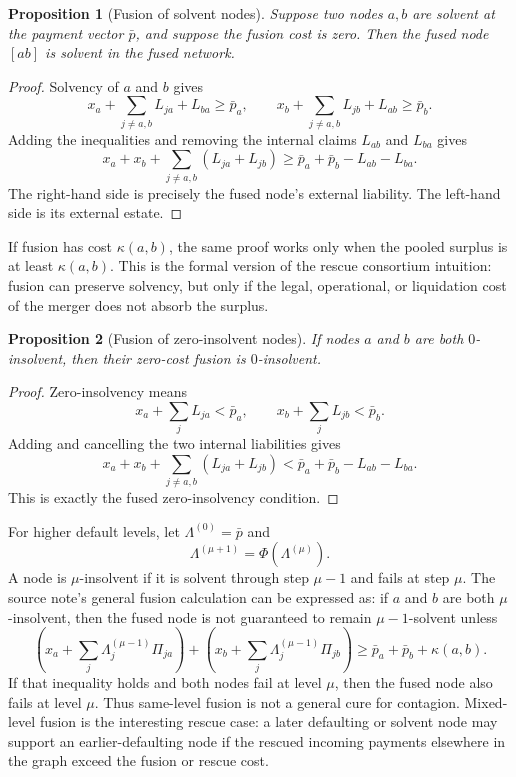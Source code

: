 \documentclass[11pt,oneside]{article}
\newtheorem{proposition}{Proposition}
\newcommand{\barp}{\bar p}
\begin{document}
\begin{proposition}[Fusion of solvent nodes]
Suppose two nodes $a,b$ are solvent at the payment vector $\barp$, and suppose
the fusion cost is zero. Then the fused node $[ab]$ is solvent in the fused
network.
\end{proposition}

\begin{proof}
Solvency of $a$ and $b$ gives
\[
  x_a+\sum_{j\neq a,b}L_{ja}+L_{ba}\geq \barp_a,
  \qquad
  x_b+\sum_{j\neq a,b}L_{jb}+L_{ab}\geq \barp_b.
\]
Adding the inequalities and removing the internal claims $L_{ab}$ and $L_{ba}$
gives
\[
  x_a+x_b+\sum_{j\neq a,b}(L_{ja}+L_{jb})
  \geq
  \barp_a+\barp_b-L_{ab}-L_{ba}.
\]
The right-hand side is precisely the fused node's external liability. The
left-hand side is its external estate.
\end{proof}

If fusion has cost $\kappa(a,b)$, the same proof works only when the pooled
surplus is at least $\kappa(a,b)$. This is the formal version of the rescue
consortium intuition: fusion can preserve solvency, but only if the legal,
operational, or liquidation cost of the merger does not absorb the surplus.

\begin{proposition}[Fusion of zero-insolvent nodes]
If nodes $a$ and $b$ are both $0$-insolvent, then their zero-cost fusion is
$0$-insolvent.
\end{proposition}

\begin{proof}
Zero-insolvency means
\[
  x_a+\sum_jL_{ja}<\barp_a,
  \qquad
  x_b+\sum_jL_{jb}<\barp_b.
\]
Adding and cancelling the two internal liabilities gives
\[
  x_a+x_b+\sum_{j\neq a,b}(L_{ja}+L_{jb})
  <
  \barp_a+\barp_b-L_{ab}-L_{ba}.
\]
This is exactly the fused zero-insolvency condition.
\end{proof}

For higher default levels, let $\Lambda^{(0)}=\barp$ and
\[
  \Lambda^{(\mu+1)}=\Phi(\Lambda^{(\mu)}).
\]
A node is $\mu$-insolvent if it is solvent through step $\mu-1$ and fails at
step $\mu$. The source note's general fusion calculation can be expressed as:
if $a$ and $b$ are both $\mu$-insolvent, then the fused node is not guaranteed
to remain $\mu-1$-solvent unless
\[
  (x_a+\sum_j\Lambda^{(\mu-1)}_j\Pi_{ja})
  +
  (x_b+\sum_j\Lambda^{(\mu-1)}_j\Pi_{jb})
  \geq
  \barp_a+\barp_b+\kappa(a,b).
\]
If that inequality holds and both nodes fail at level $\mu$, then the fused
node also fails at level $\mu$. Thus same-level fusion is not a general cure
for contagion. Mixed-level fusion is the interesting rescue case: a later
defaulting or solvent node may support an earlier-defaulting node if the
rescued incoming payments elsewhere in the graph exceed the fusion or rescue
cost.
\end{document}

